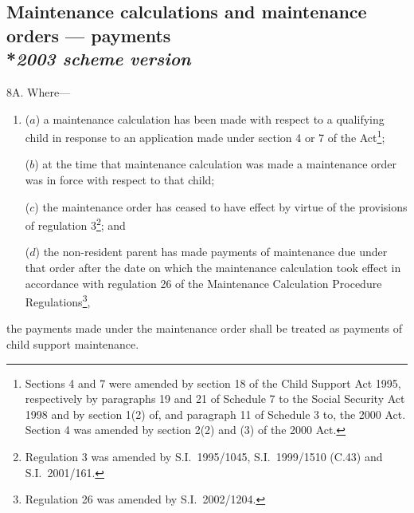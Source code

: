 \documentclass[12pt,a4paper]{article}
\begin{document}

\subsection[8A. Maintenance calculations and maintenance orders --- payments --- \emph{2003 scheme version}]{\sloppy Maintenance calculations and maintenance orders --- payments\\*\emph{2003 scheme version}}

8A.  Where—
\begin{enumerate}\item[]
($a$) a maintenance calculation has been made with respect to a qualifying child in response to an application made under section 4 or 7 of the Act\footnote{Sections 4 and 7 were amended by section 18 of the Child Support Act 1995, respectively by paragraphs 19 and 21 of Schedule 7 to the Social Security Act 1998 and by section 1(2) of, and paragraph 11 of Schedule 3 to, the 2000 Act. Section 4 was amended by section 2(2) and (3) of the 2000 Act.};

($b$) at the time that maintenance calculation was made a maintenance order was in force with respect to that child;

($c$) the maintenance order has ceased to have effect by virtue of the provisions of regulation 3\footnote{Regulation 3 was amended by S.I.\ 1995/1045, S.I.\ 1999/1510 (C.43) and S.I.\ 2001/161.}; and

($d$) the non-resident parent has made payments of maintenance due under that order after the date on which the maintenance calculation took effect in accordance with regulation 26 of the Maintenance Calculation Procedure Regulations\footnote{Regulation 26 was amended by S.I.\ 2002/1204.},
\end{enumerate}
the payments made under the maintenance order shall be treated as payments of child support maintenance.
\end{document}
